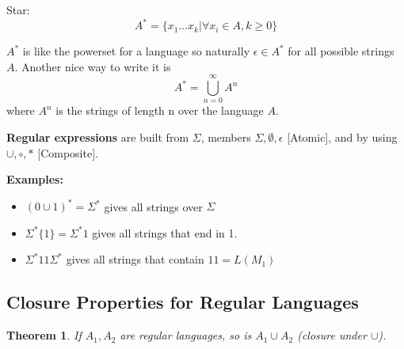 \documentclass[12pt]{article}
\newtheorem{theorem}{Theorem}
\begin{document}
\noindent 
Star: 
\[ 
    A^* = \{x_1\dots x_k | \forall x_i \in A, k \geq 0\}  
\]

\noindent 
\(A^*\) is like the powerset for a language so naturally \(\epsilon \in A^*\) for 
all possible strings \(A\).
Another nice way to write it is 
\[
    A^* = \bigcup_{n=0}^{\infty} A^n
\]
where \(A^n\) is the strings of length n over the language \(A\).

\noindent 
\textbf{Regular expressions} are built from \(\Sigma\), 
members \(\Sigma, \emptyset, \epsilon\) [Atomic], and by using 
\(\cup, \circ, *\) [Composite].

\noindent 
\textbf{Examples: }
\begin{itemize}
    \item \((0\cup 1)^* = \Sigma^* \) gives all strings over \(\Sigma\)
    \item \(\Sigma^* \{1\} = \Sigma^* 1\) gives all strings that end in 1.
    \item \(\Sigma^* 11 \Sigma^*\) gives all strings that contain \(11 = L(M_1)\)
\end{itemize}

\subsection*{Closure Properties for Regular Languages}
\begin{theorem}
    If \(A_1, A_2\) are regular languages, so is \(A_1 \cup A_2\) (closure under \(\cup\)).
\end{theorem}
\end{document}

